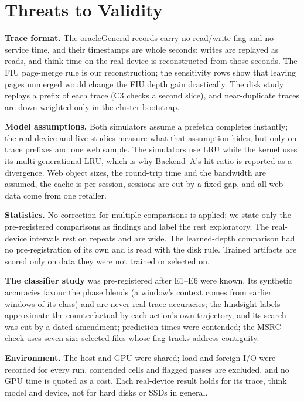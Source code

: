 
\section{Threats to Validity}\label{sec:threats}

\textbf{Trace format.} The oracleGeneral records carry no read/write flag and
no service time, and their timestamps are whole seconds; writes are replayed
as reads, and think time on the real device is reconstructed from those
seconds. The FIU page-merge rule is our reconstruction; the sensitivity rows
show that leaving pages unmerged would change the FIU depth gain drastically.
The disk study replays a prefix of each trace (C3 checks a second slice), and
near-duplicate traces are down-weighted only in the cluster bootstrap.

\textbf{Model assumptions.} Both simulators assume a prefetch completes
instantly; the real-device and live studies measure what that assumption
hides, but only on \realioTraces{} trace prefixes and one web sample. The
simulators use LRU while the kernel uses its multi-generational LRU, which is
why Backend~A's hit ratio is reported as a divergence. Web object sizes, the
round-trip time and the bandwidth are assumed, the cache is per session,
sessions are cut by a fixed gap, and all web data come from one retailer.


\textbf{Statistics.} No correction for multiple comparisons is applied; we
state only the pre-registered comparisons as findings and label the rest
exploratory. The real-device intervals rest on \realioReps{} repeats and are
wide. The learned-depth comparison had no pre-registration of its own and is
read with the disk rule. Trained artifacts are scored only on data they were
not trained or selected on.

\textbf{The classifier study} was pre-registered after E1--E6 were known.
Its synthetic accuracies favour the phase blends (a window's context comes from
earlier windows of its class) and are never real-trace accuracies; the
hindsight labels approximate the counterfactual by each action's own
trajectory, and its search was cut by a dated amendment; prediction times were
contended; the MSRC check uses seven size-selected files whose flag tracks
address contiguity.

\textbf{Environment.} The host and GPU were shared; load and foreign I/O were
recorded for every run, contended cells and flagged passes are excluded, and
no GPU time is quoted as a cost. Each real-device result holds for its trace,
think model and device, not for hard disks or SSDs in general.

